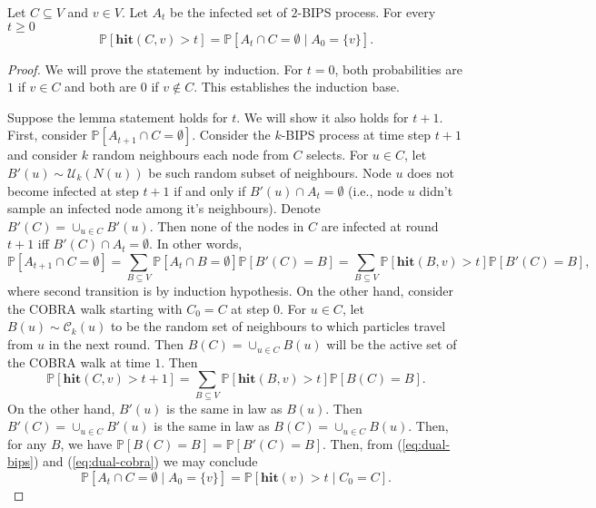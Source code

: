 \documentclass[11pt]{article}
\newcommand{\hit}{\mathbf{hit}}
\renewcommand{\Pr}{\mathbb P}
\theoremstyle{remark}
\begin{document}
\begin{lemma}
\label{lemma:dual}
    Let $C \subseteq V$ and $v \in V$. Let $A_t$ be the infected set of $2$-BIPS process. For every $t \ge 0$
    \[\Pr\left[\hit(C,v) > t \right] = \Pr\left[A_t \cap C = \emptyset \mid A_0 = \{v\} \right]. \]
\end{lemma}
\begin{proof}
    We will prove the statement by induction. For $t = 0$, both probabilities are $1$ if $v \in C$ and both are $0$ if $v \not \in C$. This establishes the induction base. 

    Suppose the lemma statement holds for $t$. We will show it also holds for $t + 1$. First, consider $\Pr\left[A_{t+1} \cap C = \emptyset\right]$. Consider the $k$-BIPS process at time step $t + 1$ and consider $k$ random neighbours each node from $C$ selects. For $u \in C$, let $B'(u) \sim \mathcal U_k(N(u))$ be such random subset of neighbours. Node $u$ does not become infected at step $t+1$ if and only if $B'(u) \cap A_t = \emptyset$ (i.e., node $u$ didn't sample an infected node among it's neighbours). Denote $B'(C) = \cup_{u \in C} B'(u)$.
    Then none of the nodes in $C$ are infected at round $t+1$ iff $B'(C) \cap A_t = \emptyset$. In other words,
    \begin{equation}
    \label{eq:dual-bips}
    \Pr\left[A_{t+1} \cap C = \emptyset\right] =  \sum_{B \subseteq V} \Pr\left[A_{t} \cap B = \emptyset\right] \Pr[B'(C) = B]= \sum_{B\subseteq V} \Pr[\hit(B,v) > t] \Pr[B'(C) = B],
    \end{equation}
    where second transition is by induction hypothesis.
    On the other hand, consider the COBRA walk starting with $C_0 = C$ at step $0$. For $u\in C$, let $B(u) \sim \mathcal C_k(u)$ to be the random set of neighbours to which particles travel from $u$ in the next round. Then $B(C) = \cup_{u \in C} B(u)$ will be the active set of the COBRA walk at time $1$. Then
    \begin{equation}
    \label{eq:dual-cobra}
    \Pr\left[\hit(C, v) > t + 1\right] = \sum_{B \subseteq V}  \Pr\left[\hit(B,v) > t\right] \Pr[B(C) = B].
    \end{equation}
    On the other hand, $B'(u)$ is the same in law as $B(u)$. Then $B'(C) = \cup_{u \in C} B'(u)$ is the same in law as $B(C) = \cup_{u \in C} B(u)$. Then, for any $B$, we have $\Pr[B(C) = B] = \Pr[B'(C) = B]$. Then, from (\ref{eq:dual-bips}) and (\ref{eq:dual-cobra}) we may conclude 
    \[\Pr\left[A_t \cap C = \emptyset \mid A_0 = \{v\} \right] = \Pr\left[\hit(v) > t \mid C_0 = C \right].\]
\end{proof}
\end{document}
